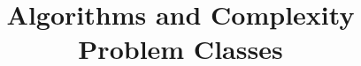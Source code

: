 \documentclass[a4paper, answers]{exam}
\title{Algorithms and Complexity Problem Classes}
\author{}
\begin{document}
    \maketitle
    \begin{questions}
        
        
    \end{questions}
\end{document}
